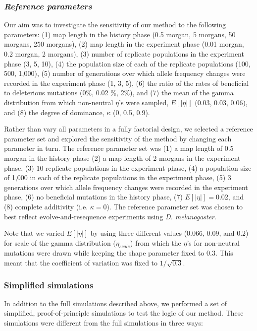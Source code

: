 \documentclass[12pt]{article}
\begin{document}
\begin{bibunit}
\subsubsection*{\textit{Reference parameters}}

Our aim was to investigate the sensitivity of our method to the following parameters: (1) map length in the history phase (0.5 morgan, 5 morgans, 50 morgans, 250 morgans), (2) map length in the experiment phase (0.01 morgan, 0.2 morgan, 2 morgans), (3) number of replicate populations in the experiment phase (3, 5, 10), (4) the population size of each of the replicate populations (100, 500, 1,000), (5) number of generations over which allele frequency changes were recorded in the experiment phase (1, 3, 5), (6) the ratio of the rates of beneficial to deleterious mutations (0\%, 0.02 \%, 2\%), and (7) the mean of the gamma distribution from which non-neutral $\eta$'s were sampled, $E[|\eta|]$ (0.03, 0.03, 0.06), and (8) the degree of dominance, $\kappa$ (0, 0.5, 0.9).

Rather than vary all parameters in a fully factorial design, we selected a reference parameter set and explored the sensitivity of the method by changing each parameter in turn. The reference parameter set was (1) a map length of 0.5 morgan in the history phase (2) a map length of 2 morgans in the experiment phase, (3) 10 replicate populations in the experiment phase, (4) a population size of 1,000 in each of the replicate populations in the experiment phase, (5) 3 generations over which allele frequency changes were recorded in the experiment phase, (6) no beneficial mutations in the history phase, (7) $E[|\eta|] = 0.02$, and (8) complete additivity (i.e. $\kappa=0$). The reference parameter set was chosen to best reflect evolve-and-resequence experiments using \emph{D. melanogaster}. 

Note that we varied $E[|\eta|]$ by using three different values (0.066, 0.09, and 0.2) for scale of the gamma distribution ($\eta_{scale}$) from which the $\eta$'s for non-neutral mutations were drawn while keeping the shape parameter fixed to 0.3. This meant that the coefficient of variation was fixed to $1/\sqrt{0.3}$.  

\subsubsection*{Simplified simulations}

In addition to the full simulations described above, we performed a set of simplified, proof-of-principle simulations to test the logic of our method. These simulations were different from the full simulations in three ways:


\end{bibunit}
\end{document}
